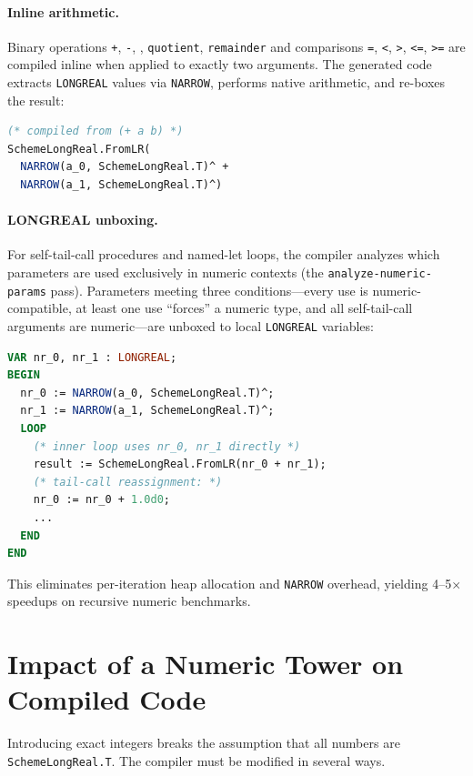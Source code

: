 \documentclass[12pt]{report}
\begin{document}
\paragraph{Inline arithmetic.}
Binary operations {\tt +}, {\tt -}, {\tt *}, {\tt quotient},
{\tt remainder} and comparisons {\tt =}, {\tt <}, {\tt >}, {\tt <=},
{\tt >=} are compiled inline when applied to exactly two arguments.
The generated code extracts {\tt LONGREAL} values via {\tt NARROW},
performs native arithmetic, and re-boxes the result:

\begin{lstlisting}[language=Modula3]
(* compiled from (+ a b) *)
SchemeLongReal.FromLR(
  NARROW(a_0, SchemeLongReal.T)^ +
  NARROW(a_1, SchemeLongReal.T)^)
\end{lstlisting}

\paragraph{LONGREAL unboxing.}
For self-tail-call procedures and named-let loops, the compiler
analyzes which parameters are used exclusively in numeric contexts
(the {\tt analyze-numeric-params} pass).  Parameters meeting three
conditions---every use is numeric-compatible, at least one use
``forces'' a numeric type, and all self-tail-call arguments are
numeric---are unboxed to local {\tt LONGREAL} variables:

\begin{lstlisting}[language=Modula3]
VAR nr_0, nr_1 : LONGREAL;
BEGIN
  nr_0 := NARROW(a_0, SchemeLongReal.T)^;
  nr_1 := NARROW(a_1, SchemeLongReal.T)^;
  LOOP
    (* inner loop uses nr_0, nr_1 directly *)
    result := SchemeLongReal.FromLR(nr_0 + nr_1);
    (* tail-call reassignment: *)
    nr_0 := nr_0 + 1.0d0;
    ...
  END
END
\end{lstlisting}

\noindent This eliminates per-iteration heap allocation and {\tt NARROW}
overhead, yielding 4--5$\times$ speedups on recursive numeric
benchmarks.

\section{Impact of a Numeric Tower on Compiled Code}
\label{sec:tower-impact}

Introducing exact integers breaks the assumption that all numbers are
{\tt SchemeLongReal.T}.  The compiler must be modified in several
ways.
\end{document}
